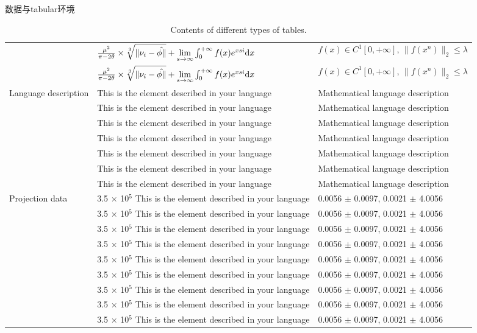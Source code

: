 \documentclass{libs/ccnu_format}
\begin{document}
\begin{frame}{数据与tabular环境}
\begin{table}[H]
{\begin{tabular}{@{\extracolsep{\fill}}*{3}{l}}
   &$\frac{\mu^2}{\pi-2\theta}\times \sqrt[3]{\|\nu_{i}-\hat{\phi\|}}+\lim\limits_{s\to\infty}\int_{0}^{+\infty}f(x)e^{xsi}{\rm d}x$ & $f(x)\in C^{1}[0,+\infty]$, $\|f(x^{n})\|_{2}\leqslant \lambda$ \\
   & $\frac{\mu^2}{\pi-2\theta}\times \sqrt[3]{\|\nu_{i}-\hat{\phi\|}}+\lim\limits_{s\to\infty}\int_{0}^{+\infty}f(x)e^{xsi}{\rm d}x$ & $f(x)\in C^{1}[0,+\infty]$, $\|f(x^{n})\|_{2}\leqslant \lambda$ \\
   \hline
\multirow{7}{*}{Language description}
    & This is the element described in your language & Mathematical language description \\
    & This is the element described in your language & Mathematical language description\\
    & This is the element described in your language & Mathematical language description \\
    & This is the element described in your language & Mathematical language description \\
    & This is the element described in your language & Mathematical language description \\
    & This is the element described in your language & Mathematical language description\\
    & This is the element described in your language & Mathematical language description\\
    \hline
\multirow{8}{*}{Projection data}
    & 3.5 $\times$ 10$^{5}$ This is the element described in your language&  0.0056 $\pm$ 0.0097, 0.0021 $\pm$ 4.0056 \\
    & 3.5 $\times$ 10$^{5}$ This is the element described in your language&  0.0056 $\pm$ 0.0097, 0.0021 $\pm$ 4.0056 \\
    & 3.5 $\times$ 10$^{5}$ This is the element described in your language&  0.0056 $\pm$ 0.0097, 0.0021 $\pm$ 4.0056 \\
    & 3.5 $\times$ 10$^{5}$ This is the element described in your language&  0.0056 $\pm$ 0.0097, 0.0021 $\pm$ 4.0056 \\
    & 3.5 $\times$ 10$^{5}$ This is the element described in your language&  0.0056 $\pm$ 0.0097, 0.0021 $\pm$ 4.0056 \\
    & 3.5 $\times$ 10$^{5}$ This is the element described in your language&  0.0056 $\pm$ 0.0097, 0.0021 $\pm$ 4.0056\\
    & 3.5 $\times$ 10$^{5}$ This is the element described in your language&  0.0056 $\pm$ 0.0097, 0.0021 $\pm$ 4.0056 \\
    & 3.5 $\times$ 10$^{5}$ This is the element described in your language&  0.0056 $\pm$ 0.0097, 0.0021 $\pm$ 4.0056 \\
    & 3.5 $\times$ 10$^{5}$ This is the element described in your language&  0.0056 $\pm$ 0.0097, 0.0021 $\pm$ 4.0056 \\
\bottomrule
  \end{tabular}
  }
  \caption{Contents of different types of tables.}
\end{table}

\end{frame}
\end{document}
